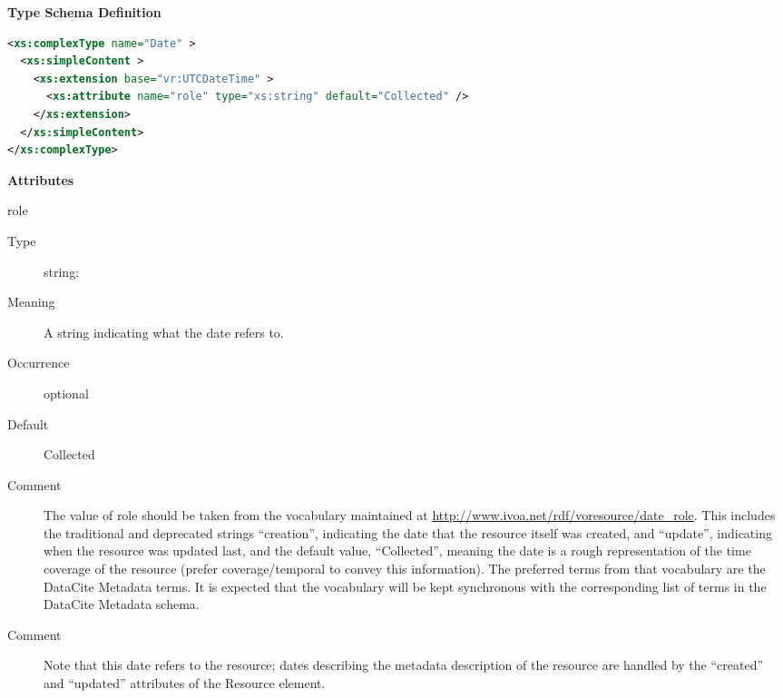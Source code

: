 \documentclass[11pt,a4paper]{ivoa}
\begin{document}
\begin{generated}
\begingroup
        \renewcommand*\descriptionlabel[1]{%
        \hbox to 5.5em{\emph{#1}\hfil}}\vspace{1ex}\noindent\textbf{ Type Schema Definition}

\begin{lstlisting}[language=XML,basicstyle=\footnotesize]
<xs:complexType name="Date" >
  <xs:simpleContent >
    <xs:extension base="vr:UTCDateTime" >
      <xs:attribute name="role" type="xs:string" default="Collected" />
    </xs:extension>
  </xs:simpleContent>
</xs:complexType>
\end{lstlisting}

\vspace{0.5ex}\noindent\textbf{ Attributes}

\begingroup\small\begin{bigdescription}
\item[role]
\begin{description}
\item[Type] string: 
\item[Meaning]
                 A string indicating what the date refers to.

\item[Occurrence] optional
\item[Default] Collected
\item[Comment]
               	The value of role should be taken from the vocabulary
               	maintained at
               	\url{http://www.ivoa.net/rdf/voresource/date_role}.
               	This includes the traditional and deprecated strings
                “creation”, indicating the date that the resource
                itself was created, and “update”, indicating when the
                resource was updated last, and the default value,
                “Collected”, meaning the date is a rough
                representation of the time coverage of the resource
                (prefer coverage/temporal to convey this information).
                The preferred terms from that vocabulary are the DataCite
                Metadata terms.   It is expected that the vocabulary will
                be kept synchronous with the corresponding list of terms
                in the DataCite Metadata schema.

\item[Comment]
                 Note that this date refers to the resource; dates describing
                 the metadata description of the resource are handled by
                 the “created” and “updated” attributes of the Resource
                 element.

\end{description}


\end{bigdescription}\endgroup

\endgroup
\end{generated}
\end{document}
